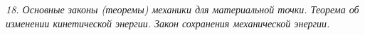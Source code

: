 \emph{18. Основные законы (теоремы) механики для материальной точки. Теорема об
изменении кинетической энергии. Закон сохранения механической энергии.}

\newpage
